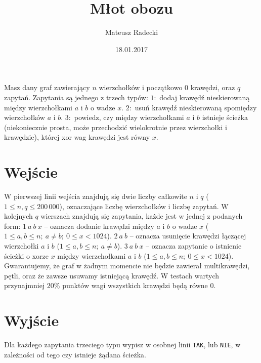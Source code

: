 \documentclass[zad,zawodnik,utf8]{sinol}
\title{Młot obozu}
\author{Mateusz Radecki} %
\date{18.01.2017}
\begin{document}
\begin{tasktext}%
    
    Masz dany graf zawierający $n$ wierzchołków i początkowo $0$ krawędzi, oraz $q$ zapytań. Zapytania są jednego z trzech typów:
\vskip 1mm
$1:$ dodaj krawędź nieskierowaną między wierzchołkami $a$ i $b$ o wadze $x$.
\vskip 1mm
$2:$ usuń krawędź nieskierowaną spomiędzy wierzchołków $a$ i $b$.
\vskip 1mm
$3:$ powiedz, czy między wierzchołkami $a$ i $b$ istnieje ścieżka (niekoniecznie prosta, może przechodzić wielokrotnie przez wierzchołki i krawędzie), której xor wag krawędzi jest równy $x$.

  \section{Wejście}

  W pierwszej linii wejścia znajdują się dwie liczby całkowite $n$ i $q$ ($1 \leq n,q \leq 200\,000$), oznaczające liczbę wierzchołków i liczbę zapytań. W kolejnych $q$ wierszach znajdują się zapytania, każde jest w jednej z podanych form:
\vskip 1mm
$1 ~ a ~ b ~ x$ -- oznacza dodanie krawędzi między $a$ i $b$ o wadze $x$ ($1 \leq a,b \leq n;~ a \neq b;~ 0 \leq x < 1024 $).
\vskip 1mm
$2 ~ a ~ b$ -- oznacza usunięcie krawędzi łączącej wierzchołki $a$ i $b$ ($1 \leq a,b \leq n;~ a \neq b$).
\vskip 1mm
$3 ~ a ~ b ~ x$ -- oznacza zapytanie o istnienie ścieżki o xorze $x$ między wierzchołkami $a$ i $b$ ($1 \leq a,b \leq n;~ 0 \leq x < 1024 $).
\vskip 4mm
Gwarantujemy, że graf w żadnym momencie nie będzie zawierał multikrawędzi, pętli, oraz że zawsze usuwamy istniejącą krawędź.
\vskip 4mm
W testach wartych przynajmniej $20\%$ punktów wagi wszystkich krawędzi będą równe $0$.

  \section{Wyjście}
   
   Dla każdego zapytania trzeciego typu wypisz w osobnej linii \texttt{TAK}, lub \texttt{NIE}, w zależności od tego czy istnieje żądana ścieżka.
  
\makecompactexample

\end{tasktext}
\end{document}
